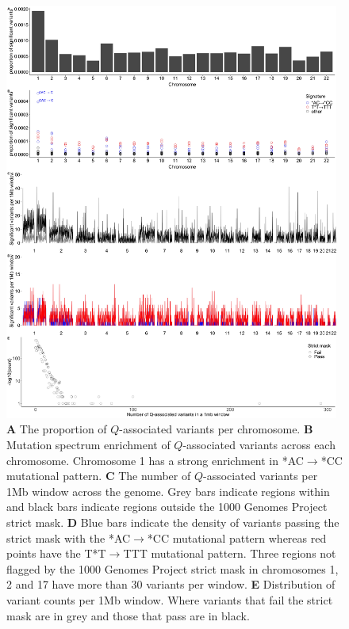 \documentclass[9pt,article]{template}
\begin{document}
\begin{figure}[tbp]
\centering
\includegraphics[width=11cm,keepaspectratio]{PerChromosome.jpg}
\caption{
\textbf{A}
The proportion of $Q$-associated variants per chromosome.
\textbf{B}
Mutation spectrum enrichment of  $Q$-associated variants across each chromosome.
Chromosome 1 has a strong enrichment in *AC${\rightarrow}$*CC mutational pattern.
\textbf{C} The number of $Q$-associated variants per 1Mb window across the genome.
Grey bars indicate regions within and black bars indicate regions outside the 1000 Genomes Project strict mask.
\textbf{D} Blue bars indicate the density of variants passing the strict mask with the *AC${\rightarrow}$*CC mutational pattern whereas red points have the T*T${\rightarrow}$TTT mutational pattern.
Three regions not flagged by the 1000 Genomes Project strict mask in chromosomes 1, 2 and 17 have more than 30 variants per window.
\textbf{E} Distribution of variant counts per 1Mb window. Where variants that fail the strict mask are in grey and those that pass are in black. 
}  
\label{CountPerChrom}
\end{figure}
\end{document}
